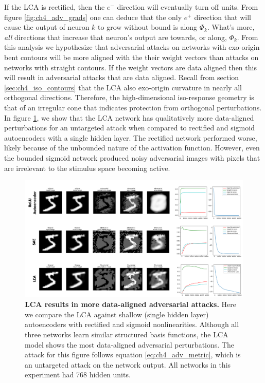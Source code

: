 If the LCA is rectified, then the $e^{-}$ direction will eventually turn off units.
From figure \ref{fig:ch4_adv_grads} one can deduce that the only $e^{+}$ direction that will cause the output of neuron $k$ to grow without bound is along $\Phi_{k}$.
What's more, \emph{all} directions that increase that neuron's output are towards, or along, $\Phi_{k}$.
From this analysis we hypothesize that adversarial attacks on networks with exo-origin bent contours will be more aligned with the their weight vectors than attacks on networks with straight contours.
If the weight vectors are data aligned then this will result in adversarial attacks that are data aligned.
Recall from section \ref{sec:ch4_iso_contours} that the LCA also exo-origin curvature in nearly all orthogonal directions.
Therefore, the high-dimensional iso-response geometry is that of an irregular cone that indicates protection from orthogonal perturbations.
In figure \ref{fig:ch4_marzi_network_attack}, we show that the LCA network has qualitatively more data-aligned perturbations for an untargeted attack when compared to rectified and sigmoid autoencoders with a single hidden layer.
The rectified network performed worse, likely because of the unbounded nature of the activation function.
However, even the bounded sigmoid network produced noisy adversarial images with pixels that are irrelevant to the stimulus space becoming active.

\begin{figure}[h]
    \centering
    \includegraphics[width=\textwidth]{figures/adv_network_marzi_lca_sae_relu.png}
    \caption{\textbf{LCA results in more data-aligned adversarial attacks.} Here we compare the LCA against shallow (single hidden layer) autoencoders with rectified and sigmoid nonlinearities. Although all three networks learn similar structured basis functions, the LCA model shows the most data-aligned adversarial perturbations. The attack for this figure follows equation \eqref{eq:ch4_adv_metric}, which is an untargeted attack on the network output. All networks in this experiment had 768 hidden units.}
    \label{fig:ch4_marzi_network_attack}
\end{figure}



